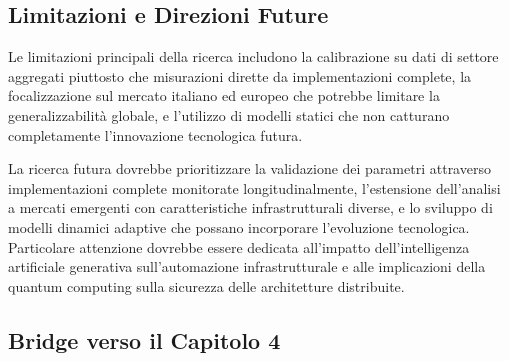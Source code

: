 \subsection{Limitazioni e Direzioni Future}

Le limitazioni principali della ricerca includono la calibrazione su dati di settore aggregati piuttosto che misurazioni dirette da implementazioni complete, la focalizzazione sul mercato italiano ed europeo che potrebbe limitare la generalizzabilità globale, e l'utilizzo di modelli statici che non catturano completamente l'innovazione tecnologica futura.

La ricerca futura dovrebbe prioritizzare la validazione dei parametri attraverso implementazioni complete monitorate longitudinalmente, l'estensione dell'analisi a mercati emergenti con caratteristiche infrastrutturali diverse, e lo sviluppo di modelli dinamici adaptive che possano incorporare l'evoluzione tecnologica. Particolare attenzione dovrebbe essere dedicata all'impatto dell'intelligenza artificiale generativa sull'automazione infrastrutturale e alle implicazioni della quantum computing sulla sicurezza delle architetture distribuite.

\subsection{Bridge verso il Capitolo 4}


